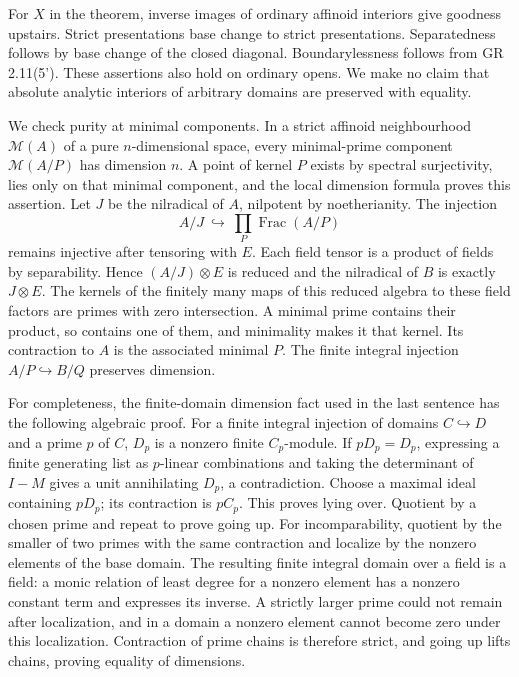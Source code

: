 \documentclass[
  11pt,
]{article}
\begin{document}
For \(X\) in the theorem, inverse images of ordinary affinoid interiors
give goodness upstairs. Strict presentations base change to strict
presentations. Separatedness follows by base change of the closed
diagonal. Boundarylessness follows from GR 2.11(5'). These assertions
also hold on ordinary opens. We make no claim that absolute analytic
interiors of arbitrary domains are preserved with equality.

We check purity at minimal components. In a strict affinoid
neighbourhood \(\mathcal M(A)\) of a pure \(n\)-dimensional space, every
minimal-prime component \(\mathcal M(A/P)\) has dimension \(n\). A point
of kernel \(P\) exists by spectral surjectivity, lies only on that
minimal component, and the local dimension formula proves this
assertion. Let \(J\) be the nilradical of \(A\), nilpotent by
noetherianity. The injection \[
 A/J\ \hookrightarrow\ \prod_P\operatorname{Frac}(A/P)
\] remains injective after tensoring with \(E\). Each field tensor is a
product of fields by separability. Hence \((A/J)\otimes E\) is reduced
and the nilradical of \(B\) is exactly \(J\otimes E\). The kernels of
the finitely many maps of this reduced algebra to these field factors
are primes with zero intersection. A minimal prime contains their
product, so contains one of them, and minimality makes it that kernel.
Its contraction to \(A\) is the associated minimal \(P\). The finite
integral injection \(A/P\hookrightarrow B/Q\) preserves dimension.

For completeness, the finite-domain dimension fact used in the last
sentence has the following algebraic proof. For a finite integral
injection of domains \(C\hookrightarrow D\) and a prime \(p\) of \(C\),
\(D_p\) is a nonzero finite \(C_p\)-module. If \(pD_p=D_p\), expressing
a finite generating list as \(p\)-linear combinations and taking the
determinant of \(I-M\) gives a unit annihilating \(D_p\), a
contradiction. Choose a maximal ideal containing \(pD_p\); its
contraction is \(pC_p\). This proves lying over. Quotient by a chosen
prime and repeat to prove going up. For incomparability, quotient by the
smaller of two primes with the same contraction and localize by the
nonzero elements of the base domain. The resulting finite integral
domain over a field is a field: a monic relation of least degree for a
nonzero element has a nonzero constant term and expresses its inverse. A
strictly larger prime could not remain after localization, and in a
domain a nonzero element cannot become zero under this localization.
Contraction of prime chains is therefore strict, and going up lifts
chains, proving equality of dimensions.
\end{document}
